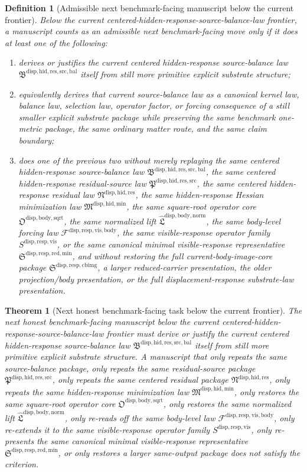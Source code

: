 \documentclass[11pt]{article}
\newcommand{\SourceBalanceLawPackage}{\mathfrak B^{\mathrm{disp,hid,res,src,bal}}}
\newcommand{\ResidualSourceLawPackage}{\mathfrak P^{\mathrm{disp,hid,res,src}}}
\newcommand{\ResidualLawPackage}{\mathfrak N^{\mathrm{disp,hid,res}}}
\newcommand{\HiddenMinimizationPackage}{\mathfrak M^{\mathrm{disp,hid,min}}}
\newcommand{\SquareRootOperatorCore}{\mathfrak O^{\mathrm{disp,body,sqrt}}}
\newcommand{\NormalizedLiftPackage}{\widehat{\mathfrak L}^{\mathrm{disp,body,norm}}}
\newcommand{\VisibleBodyForcingLaw}{\mathscr F^{\mathrm{disp,resp,vis,body}}}
\newcommand{\VisibleResponseOperator}{S^{\mathrm{disp,resp,vis}}}
\newcommand{\MinimalReducedStructure}{\mathfrak S^{\mathrm{disp,resp,red,min}}}
\newcommand{\CurrentBodyImageCore}{\mathfrak S^{\mathrm{disp,resp,cbimg}}}
\newtheorem{definition}{Definition}
\newtheorem{theorem}{Theorem}
\begin{document}
\begin{definition}[Admissible next benchmark-facing manuscript below the current frontier]
Below the current centered-hidden-response-source-balance-law frontier, a manuscript counts as an admissible next benchmark-facing move only if it does at least one of the following:
\begin{enumerate}
    \item derives or justifies the current centered hidden-response source-balance law \(\SourceBalanceLawPackage\) itself from still more primitive explicit substrate structure;
    \item equivalently derives that current source-balance law as a canonical kernel law, balance law, selection law, operator factor, or forcing consequence of a still smaller explicit substrate package while preserving the same benchmark one-metric package, the same ordinary matter route, and the same claim boundary;
    \item does one of the previous two without merely replaying the same centered hidden-response source-balance law \(\SourceBalanceLawPackage\), the same centered hidden-response residual-source law \(\ResidualSourceLawPackage\), the same centered hidden-response residual law \(\ResidualLawPackage\), the same hidden-response Hessian minimization law \(\HiddenMinimizationPackage\), the same square-root operator core \(\SquareRootOperatorCore\), the same normalized lift \(\NormalizedLiftPackage\), the same body-level forcing law \(\VisibleBodyForcingLaw\), the same visible-response operator family \(\VisibleResponseOperator\), or the same canonical minimal visible-response representative \(\MinimalReducedStructure\), and without restoring the full current-body-image-core package \(\CurrentBodyImageCore\), a larger reduced-carrier presentation, the older projection/body presentation, or the full displacement-response substrate-law presentation.
\end{enumerate}
\end{definition}

\begin{theorem}[Next honest benchmark-facing task below the current frontier]
The next honest benchmark-facing manuscript below the current centered-hidden-response-source-balance-law frontier must derive or justify the current centered hidden-response source-balance law \(\SourceBalanceLawPackage\) itself from still more primitive explicit substrate structure. A manuscript that only repeats the same source-balance package, only repeats the same residual-source package \(\ResidualSourceLawPackage\), only repeats the same centered residual package \(\ResidualLawPackage\), only repeats the same hidden-response minimization law \(\HiddenMinimizationPackage\), only restores the same square-root operator core \(\SquareRootOperatorCore\), only restores the same normalized lift \(\NormalizedLiftPackage\), only re-reads off the same body-level law \(\VisibleBodyForcingLaw\), only re-extends it to the same visible-response operator family \(\VisibleResponseOperator\), only re-presents the same canonical minimal visible-response representative \(\MinimalReducedStructure\), or only restores a larger same-output package does not satisfy the criterion.
\end{theorem}
\end{document}
